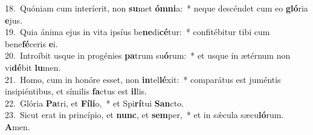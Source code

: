 {18.~}Quóniam cum interíerit, non \textbf{su}met \textbf{óm}\textbf{ni}a:~* neque descéndet cum eo \textbf{gló}ria \textbf{e}jus.\\
{19.~}Quia ánima ejus in vita ipsíus be\textbf{ne}di\textbf{cé}tur:~* confitébitur tibi cum bene\textbf{fé}ceris \textbf{e}i.\\
{20.~}Introíbit usque in progénies \textbf{pa}trum su\textbf{ó}rum:~* et usque in ætérnum non vi\textbf{dé}bit \textbf{lu}men.\\
{21.~}Homo, cum in honóre esset, non \textbf{in}tel\textbf{lé}xit:~* comparátus est juméntis insipiéntibus, et símilis \textbf{fa}ctus est \textbf{il}lis.\\
{22.~}Glória \textbf{Pa}tri, et \textbf{Fí}\textbf{li}o,~* et Spi\textbf{rí}tui \textbf{San}cto.\\
{23.~}Sicut erat in princípio, et \textbf{nunc}, et \textbf{sem}per,~* et in sǽcula sæcu\textbf{ló}rum. \textbf{A}men.\\

